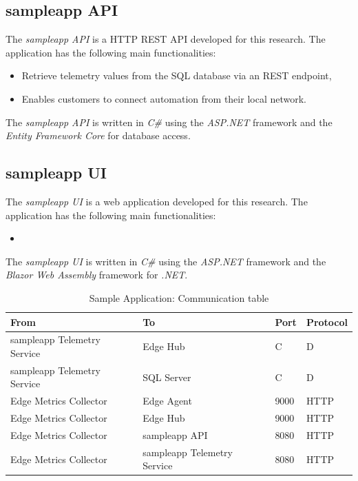 \subsection{sampleapp API} \label{sec:api}
The \textit{sampleapp API} is a \ac{HTTP} \ac{REST} \ac{API} developed for this
research. The application has the following main functionalities:

\begin{itemize}
    \item Retrieve telemetry values from the \ac{SQL} database via an
    \ac{REST} endpoint,
    \item Enables customers to connect automation from their local network.
\end{itemize}
The \textit{sampleapp API} is written in \textit{C\#} using the \textit{ASP.NET}
framework and the \textit{Entity Framework Core} for database access.

\subsection{sampleapp UI} \label{sec:ui}
The \textit{sampleapp UI} is a web application developed for this research.
The application has the following main functionalities:

\begin{itemize}
    \item
\end{itemize}
The \textit{sampleapp UI} is written in \textit{C\#} using the \textit{ASP.NET}
framework and the \textit{Blazor Web Assembly} framework for \textit{.NET}.


\begin{table}[H]
    \centering
    \begin{tabular}{l l l l }
        \toprule
        \textbf{From} & \textbf{To} & \textbf{Port} & \textbf{Protocol} \\
        \midrule
        sampleapp Telemetry Service & Edge Hub & C & D \\
        sampleapp Telemetry Service & SQL Server & C & D \\
        Edge Metrics Collector & Edge Agent & 9000 & \ac{HTTP} \\
        Edge Metrics Collector & Edge Hub & 9000 & \ac{HTTP} \\
        Edge Metrics Collector & sampleapp API & 8080 & \ac{HTTP} \\
        Edge Metrics Collector & sampleapp Telemetry Service & 8080 & \ac{HTTP} \\
        \bottomrule
    \end{tabular}
    \caption{Sample Application: Communication table}
\end{table}


